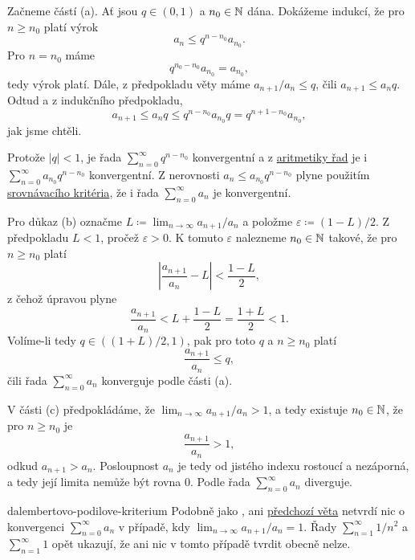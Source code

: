 \begin{thmproof}
 Začneme částí (a). Ať jsou $q \in (0,1)$ a $n_0 \in \mathbb{N}$ dána. Dokážeme indukcí,
 že pro $n \geq n_0$ platí výrok
 \[
  a_n \leq q^{n-n_0}a_{n_0}.
 \]
 Pro $n = n_0$ máme
 \[
  q^{n_0 - n_0}a_{n_0} = a_{n_0},
 \]
 tedy výrok platí. Dále, z předpokladu věty máme $a_{n+1} / a_n \leq q$, čili
 $a_{n+1} \leq a_nq$. Odtud a z indukčního předpokladu,
 \[
  a_{n+1} \leq a_n q \leq q^{n-n_0}a_{n_0}q = q^{n+1-n_0}a_{n_0},
 \]
 jak jsme chtěli.

 Protože $|q|<1$, je řada $\sum_{n = 0}^{\infty} q^{n-n_0}$ konvergentní a z
 \hyperref[prop:aritmetika-ciselnych-rad]{aritmetiky řad} je i $\sum_{n =
 0}^{\infty} a_{n_0}q^{n-n_0}$ konvergentní. Z nerovnosti $a_n \leq
 a_{n_0}q^{n-n_0}$ plyne použitím
 \hyperref[prop:srovnavaci-kriterium]{srovnávacího kritéria}, že i řada $\sum_{n
 = 0}^{\infty} a_n$ je konvergentní.

 Pro důkaz (b) označme $L \coloneqq \lim_{n \to \infty} a_{n+1} / a_n$ a položme
 $\varepsilon \coloneqq (1-L) / 2$. Z předpokladu $L < 1$, pročež
 $\varepsilon>0$. K tomuto $\varepsilon$ nalezneme $n_0 \in \mathbb{N}$ takové, že pro
 $n \geq n_0$ platí
 \[
  \left| \frac{a_{n+1}}{a_n} - L\right| < \frac{1-L}{2},
 \]
 z čehož úpravou plyne
 \[
  \frac{a_{n+1}}{a_n} < L + \frac{1-L}{2} = \frac{1+L}{2} < 1.
 \]
 Volíme-li tedy $q \in ((1+L) / 2,1)$, pak pro toto $q$ a $n \geq n_0$ platí
 \[
  \frac{a_{n+1}}{a_n} \leq q,
 \]
 čili řada $\sum_{n = 0}^{\infty} a_n$ konverguje podle části (a).

 V části (c) předpokládáme, že $\lim_{n \to \infty} a_{n+1} / a_n > 1$, a tedy
 existuje $n_0 \in \mathbb{N}$, že pro $n \geq n_0$ je
 \[
  \frac{a_{n+1}}{a_n} > 1,
 \]
 odkud $a_{n+1} > a_n$. Posloupnost $a_n$ je tedy od jistého indexu rostoucí a
 nezáporná, a tedy její limita nemůže být rovna $0$. Podle
  řada $\sum_{n =
 0}^{\infty} a_n$ diverguje.
\end{thmproof}

\begin{warning}{}{dalembertovo-podilove-kriterium}
 Podobně jako , ani
 \hyperref[thm:dalembertovo-podilove-kriterium]{předchozí věta} netvrdí nic o
 konvergenci $\sum_{n = 0}^{\infty} a_n$ v případě, kdy $\lim_{n \to \infty}
 a_{n+1} / a_n = 1$. Řady $\sum_{n = 1}^{\infty} 1 / n^2$ a $\sum_{n=1}^{\infty}
 1$ opět ukazují, že ani nic v tomto případě tvrdit obecně nelze.
\end{warning}


